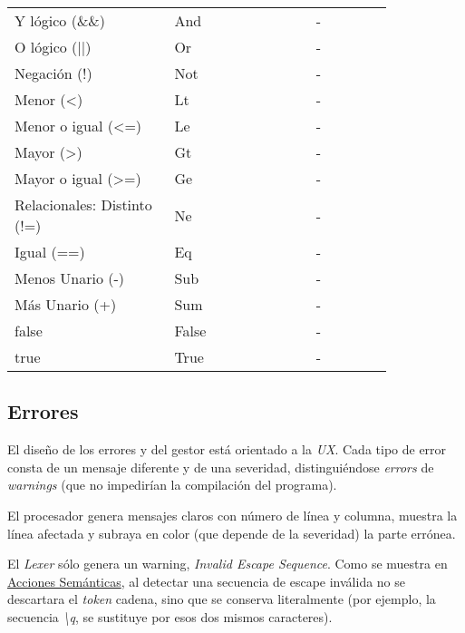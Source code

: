 \documentclass[a4paper]{CSMakotoTechnicalReport}
\begin{document}
\begin{multicols}{2}
\begin{table}[H]
\begin{tabular}{L{0.35\linewidth} L{0.31\linewidth} L{0.17\linewidth}}
            Y lógico (\&\&) & And & - \\
            O lógico (||) & Or & - \\
            Negación (!) & Not & - \\
            Menor (<) & Lt & - \\
            Menor o igual (<=) & Le & - \\
            Mayor (>) & Gt & - \\
            Mayor o igual (>=) & Ge & - \\
            Relacionales: Distinto (!=) & Ne & - \\
            Igual (==) & Eq & - \\
            Menos Unario (-) & Sub & - \\
            Más Unario (+) & Sum & - \\
            false & False & - \\
            true & True & - \\
            \bottomrule
        \end{tabular}
        \label{tab:example}
    \end{table}

    \subsection{Errores}

    El diseño de los errores y del gestor está orientado a la \textit{UX}. Cada tipo de error consta de un mensaje diferente y de una severidad, distinguiéndose \textit{errors} de \textit{warnings} (que no impedirían la compilación del programa).

    El procesador genera mensajes claros con número de línea y columna, muestra la línea afectada y subraya en color (que depende de la severidad) la parte errónea.

    El \textit{Lexer} sólo genera un warning, \textit{Invalid Escape Sequence}. Como se muestra en \hyperref[subsec:acciones-semanticas]{Acciones Semánticas}, al detectar una secuencia de escape inválida no se descartara el \textit{token} cadena, sino que se conserva literalmente (por ejemplo, la secuencia \textit{\textbackslash q}, se sustituye por esos dos mismos caracteres).


\end{multicols}
\end{document}
